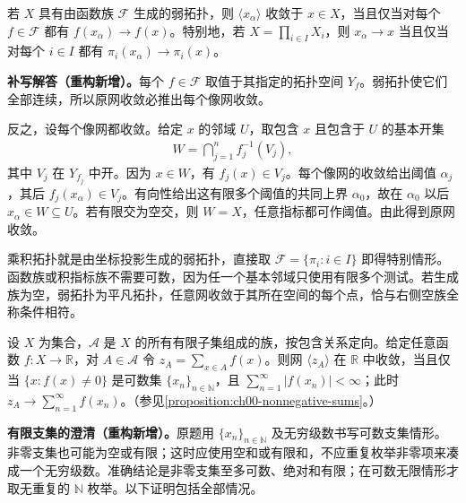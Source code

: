 \documentclass[../../main.tex]{subfiles}%
\begin{document}
\begin{exercise}\label{exercise:ch04-weak-net-convergence}
若 $X$ 具有由函数族 $\mathcal F$ 生成的弱拓扑，则 $\langle x_\alpha\rangle$ 收敛于 $x\in X$，当且仅当对每个 $f\in\mathcal F$ 都有 $f(x_\alpha)\to f(x)$。特别地，若 $X=\prod_{i\in I}X_i$，则 $x_\alpha\to x$ 当且仅当对每个 $i\in I$ 都有 $\pi_i(x_\alpha)\to\pi_i(x)$。
\end{exercise}
\begin{solution}
\textbf{补写解答（重构新增）。}每个 $f\in\mathcal F$ 取值于其指定的拓扑空间 $Y_f$。弱拓扑使它们全部连续，所以原网收敛必推出每个像网收敛。

反之，设每个像网都收敛。给定 $x$ 的邻域 $U$，取包含 $x$ 且包含于 $U$ 的基本开集
\begin{align*}
W=\bigcap_{j=1}^n f_j^{-1}(V_j),
\end{align*}
其中 $V_j$ 在 $Y_{f_j}$ 中开。因为 $x\in W$，有 $f_j(x)\in V_j$。每个像网的收敛给出阈值 $\alpha_j$，其后 $f_j(x_\alpha)\in V_j$。有向性给出这有限多个阈值的共同上界 $\alpha_0$，故在 $\alpha_0$ 以后 $x_\alpha\in W\subseteq U$。若有限交为空交，则 $W=X$，任意指标都可作阈值。由此得到原网收敛。

乘积拓扑就是由坐标投影生成的弱拓扑，直接取 $\mathcal F=\{\pi_i:i\in I\}$ 即得特别情形。函数族或积指标族不需要可数，因为任一个基本邻域只使用有限多个测试。若生成族为空，弱拓扑为平凡拓扑，任意网收敛于其所在空间的每个点，恰与右侧空族全称条件相符。
\end{solution}
\begin{exercise}\label{exercise:ch04-unordered-sums}
设 $X$ 为集合，$\mathcal A$ 是 $X$ 的所有有限子集组成的族，按包含关系定向。给定任意函数 $f:X\to\mathbb R$，对 $A\in\mathcal A$ 令 $z_A=\sum_{x\in A}f(x)$。则网 $\langle z_A\rangle$ 在 $\mathbb R$ 中收敛，当且仅当 $\{x:f(x)\ne0\}$ 是可数集 $\{x_n\}_{n\in\mathbb N}$，且 $\sum_{n=1}^\infty|f(x_n)|<\infty$；此时 $z_A\to\sum_{n=1}^\infty f(x_n)$。（参见\cref{proposition:ch00-nonnegative-sums}。）
\end{exercise}
\begin{remark}
\textbf{有限支集的澄清（重构新增）。}原题用 $\{x_n\}_{n\in\mathbb N}$ 及无穷级数书写可数支集情形。非零支集也可能为空或有限；这时应使用空和或有限和，不应重复枚举非零项来凑成一个无穷级数。准确结论是非零支集至多可数、绝对和有限；在可数无限情形才取无重复的 $\mathbb N$ 枚举。以下证明包括全部情况。
\end{remark}
\end{document}
